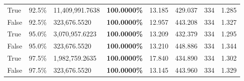 \begin{table}[H]
\begin{tabular}{lllrllll}
\cline{1-8}
True & 92.5\% & 11,409,991.7638 & \bfseries \color{red} 100.0000\% & 13.185 & 429.037 & 334 & 1.285 \\
\cline{1-8}
False & 92.5\% & 323,676.5520 & \bfseries \color{red} 100.0000\% & 12.957 & 443.208 & 334 & 1.327 \\
\cline{1-8}
True & 95.0\% & 3,070,957.6223 & \bfseries \color{red} 100.0000\% & 13.209 & 432.379 & 334 & 1.295 \\
\cline{1-8}
False & 95.0\% & 323,676.5520 & \bfseries \color{red} 100.0000\% & 13.210 & 448.886 & 334 & 1.344 \\
\cline{1-8}
True & 97.5\% & 1,982,759.2635 & \bfseries \color{red} 100.0000\% & 17.840 & 434.890 & 334 & 1.302 \\
\cline{1-8}
False & 97.5\% & 323,676.5520 & \bfseries \color{red} 100.0000\% & 13.145 & 443.960 & 334 & 1.329 \\
\cline{1-8}
\bottomrule
\end{tabular}
\end{table}
